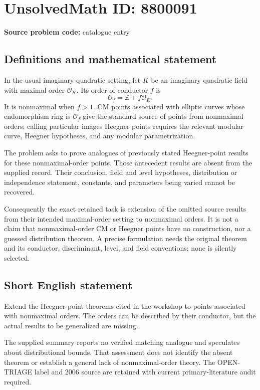\documentclass[11pt]{article}
\newcommand{\Z}{\mathbb{Z}}
\begin{document}
\section*{UnsolvedMath ID: 8800091}
\textbf{Source problem code:} catalogue entry
\subsection{Definitions and mathematical statement}
In the usual imaginary-quadratic setting, let $K$ be an imaginary quadratic field with maximal order $\mathcal O_K$. Its order of conductor $f$ is
\[
 \mathcal O_f=\Z+f\mathcal O_K.
\]
It is nonmaximal when $f>1$. CM points associated with elliptic curves whose endomorphism ring is $\mathcal O_f$ give the standard source of points from nonmaximal orders; calling particular images Heegner points requires the relevant modular curve, Heegner hypotheses, and any modular parametrization.

The problem asks to prove analogues of previously stated Heegner-point results for these nonmaximal-order points. Those antecedent results are absent from the supplied record. Their conclusion, field and level hypotheses, distribution or independence statement, constants, and parameters being varied cannot be recovered.

Consequently the exact retained task is extension of the omitted source results from their intended maximal-order setting to nonmaximal orders. It is not a claim that nonmaximal-order CM or Heegner points have no construction, nor a guessed distribution theorem. A precise formulation needs the original theorem and its conductor, discriminant, level, and field conventions; none is silently selected.
\subsection{Short English statement}
Extend the Heegner-point theorems cited in the workshop to points associated with nonmaximal orders. The orders can be described by their conductor, but the actual results to be generalized are missing.

The supplied summary reports no verified matching analogue and speculates about distributional bounds. That assessment does not identify the absent theorem or establish a general lack of nonmaximal-order theory. The OPEN-TRIAGE label and 2006 source are retained with current primary-literature audit required.
\end{document}
